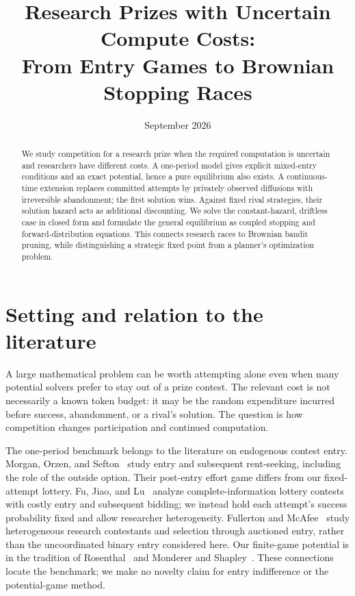 \documentclass[11pt]{article}
\title{Research Prizes with Uncertain Compute Costs:\\From Entry Games to Brownian Stopping Races}
\author{}
\date{September 2026}
\begin{document}
\maketitle
\begin{abstract}
We study competition for a research prize when the required computation is
uncertain and researchers have different costs. A one-period model gives
explicit mixed-entry conditions and an exact potential, hence a pure
equilibrium also exists. A continuous-time extension replaces committed
attempts by privately observed diffusions with irreversible abandonment;
the first solution wins. Against fixed rival strategies, their solution
hazard acts as additional discounting. We solve the constant-hazard,
driftless case in closed form and formulate the general equilibrium as
coupled stopping and forward-distribution equations. This connects research
races to Brownian bandit pruning, while distinguishing a strategic fixed
point from a planner's optimization problem.
\end{abstract}

\section{Setting and relation to the literature}
A large mathematical problem can be worth attempting alone even when many
potential solvers prefer to stay out of a prize contest. The relevant cost
is not necessarily a known token budget: it may be the random expenditure
incurred before success, abandonment, or a rival's solution. The question
is how competition changes participation and continued computation.

The one-period benchmark belongs to the literature on endogenous contest
entry. Morgan, Orzen, and Sefton~\cite{morgan} study entry and subsequent
rent-seeking, including the role of the outside option. Their post-entry
effort game differs from our fixed-attempt lottery. Fu, Jiao, and
Lu~\cite{fu} analyze complete-information lottery contests with costly
entry and subsequent bidding; we instead hold each attempt's success
probability fixed and allow researcher heterogeneity. Fullerton and
McAfee~\cite{fullerton} study heterogeneous research contestants and
selection through auctioned entry, rather than the uncoordinated binary
entry considered here. Our finite-game potential is in the tradition of
Rosenthal~\cite{rosenthal} and Monderer and Shapley~\cite{monderer}.
These connections locate the benchmark; we make no novelty claim for
entry indifference or the potential-game method.
\end{document}
